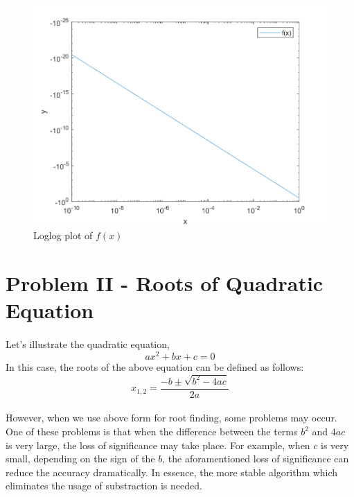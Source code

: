 \documentclass[letterpaper,12pt]{article}
\begin{document}
  \begin{figure}[H] 
    \centering \includegraphics[width=\columnwidth]{figures/loglogc.png}           
       \caption{Loglog plot of $f(x)$}                
                    \label{fig:loglogc}
    \end{figure}




\section{Problem II - Roots of Quadratic Equation}
\paragraph{}Let's illustrate the quadratic equation, 
\begin{equation*}
   ax^2 + bx + c = 0
\end{equation*}
In this case, the roots of the above equation can be defined as follows:
\begin{equation*}
   x_{1,2} = \frac{-b \pm \sqrt{b^2 - 4ac}}{2a}
\end{equation*}
\paragraph{}However, when we use above form for root finding, some problems may occur. One of these problems is that when the difference between the terms $b^2$ and $4ac$ is very large, the loss of significance may take place. For example, when $c$ is very small, depending on the sign of the $b$, the aforamentioned loss of significance can reduce the accuracy dramatically. In essence, the more stable algorithm which eliminates the usage of substraction is needed.
\end{document}
